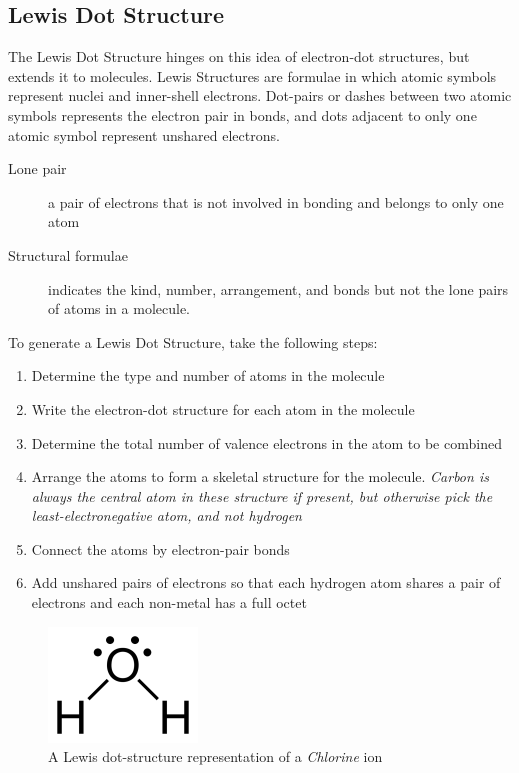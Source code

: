 \subsection{Lewis Dot Structure}
The Lewis Dot Structure hinges on this idea of electron-dot structures, but
extends it to molecules.  Lewis Structures are formulae in which atomic symbols
represent nuclei and inner-shell electrons.  Dot-pairs or dashes between two
atomic symbols represents the electron pair in bonds, and dots adjacent to only
one atomic symbol represent unshared electrons.

\begin{description}
  \item[Lone pair] a pair of electrons that is not involved in bonding and
    belongs to only one atom
  \item[Structural formulae] indicates the kind, number, arrangement, and bonds
    but not the lone pairs of atoms in a molecule.
\end{description}

To generate a Lewis Dot Structure, take the following steps:

\begin{enumerate}
  \item Determine the type and number of atoms in the molecule
  \item Write the electron-dot structure for each atom in the molecule
  \item Determine the total number of valence electrons in the atom to be
    combined
  \item Arrange the atoms to form a skeletal structure for the molecule.
    \textit{Carbon is always the central atom in these structure if present, but
    otherwise pick the least-electronegative atom, and not hydrogen}
  \item Connect the atoms by electron-pair bonds
  \item Add unshared pairs of electrons so that each hydrogen atom shares a pair
    of electrons and each non-metal has a full octet
\end{enumerate}

\begin{figure}[H]
  \centering
  \includegraphics{res/lewis_structure_water.png}
  \caption{A Lewis dot-structure representation of a \textit{Chlorine} ion}
\end{figure}

